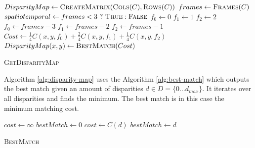 \begin{algorithm}[h!]
\DontPrintSemicolon
{}
$DisparityMap \gets \textsc{CreateMatrix}(\textsc{Cols}(C),\textsc{Rows}(C))$\;
$frames \gets \textsc{Frames}(C)$\;
$spatiotemporal \gets frames < 3\ ?\ \textsc{True} : \textsc{False}$\;
 {
   {
     {
       {
         {
          $f_{0} \gets 0$\;
          $f_{1} \gets 1$\;
          $f_{2} \gets 2$\;
        }
         {
          $f_{0} \gets frames - 3$\;
          $f_{1} \gets frames - 2$\;
          $f_{2} \gets frames - 1$\;
        }
         {
          $Cost \gets \frac{1}{4} C(x,y,f_0) + \frac{2}{4} C(x,y,f_1)+ \frac{1}{4} C(x,y,f_2)$\;
        }
        $DisparityMap(x,y) \gets \textsc{BestMatch}(Cost)$\;
      }
    }
  }
}
\;
\caption{\textsc{GetDisparityMap}}
\label{alg:disparity-map}
\end{algorithm}

\noindent Algorithm \ref{alg:disparity-map} uses the Algorithm \ref{alg:best-match} which outputs the best match given an amount of disparities $d \in D=\{0{\dots}d_{max}\}$.
It iterates over all disparities and finds the minimum.
The best match is in this case the minimum matching cost.

\begin{algorithm}[h!]
\DontPrintSemicolon
{}
$cost \gets \infty$\;
$bestMatch \gets 0$\;
 {
   {
    $cost \gets C(d)$\;
    $bestMatch \gets d$\;
  }
}
\;
\caption{\textsc{BestMatch}}
\label{alg:best-match}
\end{algorithm}

